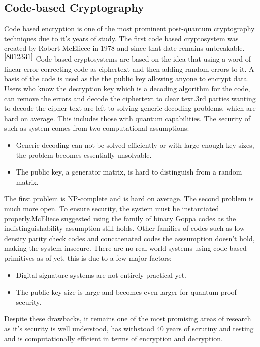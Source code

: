 \documentclass[10pt,a4paper]{IEEEtran}
\begin{document}
\subsection{Code-based Cryptography}
Code based encryption is one of the most prominent post-quantum cryptography techniques due to it's years of study. The first code based cryptosystem was created by Robert McEliece in 1978 and since that date remains unbreakable.\(^{\cite{8012331}}\)
\newline
\newline
Code-based cryptosystems are based on the idea that using a word of linear error-correcting code as ciphertext and then adding random errors to it. A basis of the code is used as the the public key allowing anyone to encrypt data. Users who know the decryption key which is a decoding algorithm for the code, can remove the errors and decode the ciphertext to clear text.3rd parties wanting to decode the cipher text are left to solving generic decoding problems, which are hard on average. This includes those with quantum capabilities. 
\newline
\newline
The security of such as system comes from two computational assumptions:
\begin{itemize}
\item Generic decoding can not be solved efficiently or with large enough key sizes, the problem becomes essentially unsolvable.
\item The public key, a generator matrix, is hard to distinguish from a random matrix.
\end{itemize}
The first problem is NP-complete and is hard on average. The second problem is much more open. To ensure security, the system must be instantiated properly.McEliece suggested using the family of binary Goppa codes as the indistinguishability assumption still holds. Other families of codes such as low-density parity check codes and concatenated codes the asssumption doesn't hold, making the system insecure. 
\newline
\newline
There are no real world systems using code-based primitives as of yet, this is due to a few major factors:
\begin{itemize}
\item Digital signature systems are not entirely practical yet.
\item The public key size is large and becomes even larger for quantum proof security.
\end{itemize}
Despite these drawbacks, it remains one of the most promising areas of research as it's security is well understood, has withstood 40 years of scrutiny and testing and is computationally efficient in terms of encryption and decryption.
\newline
\end{document}
